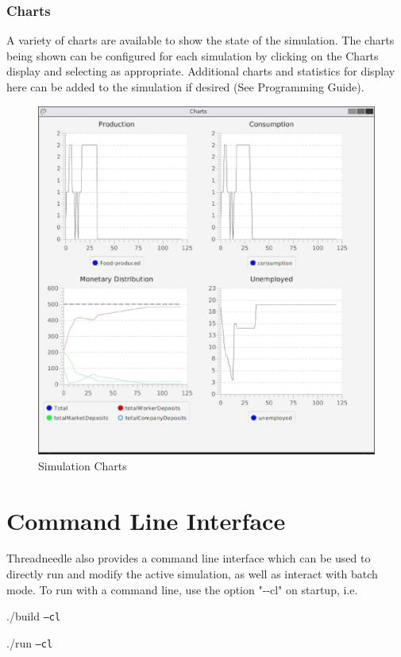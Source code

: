 \documentclass[10pt,oneside,openright, a4paper]{memoir}
\begin{document}
\subsection{Charts}
A variety of charts are available to show the state of the simulation.
The charts being shown can be configured for each simulation by clicking
on the Charts display and selecting as appropriate. Additional
charts and statistics for display here can be added to the simulation 
if desired (See Programming Guide).
\begin{figure}[h]
\begin{center}
\includegraphics[width=14cm]{images/fig_charts.eps}
\caption{Simulation Charts}
\label{fig_charts}
\end{center}
\end{figure}

\chapter{Command Line Interface}
Threadneedle also provides a command line interface which can be
used to directly run and modify the active
simulation, as well as interact with batch mode.  To run with a command
line, use the option "-{}-cl" on startup, i.e.
\begin{description}[itemindent=3cm]
\item ./build \texttt{--cl}
\item ./run \texttt{--cl}
\end{description}
\end{document}
